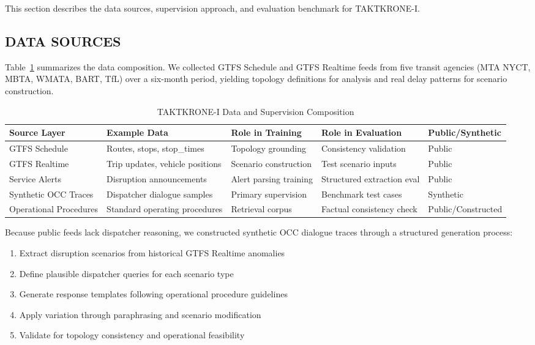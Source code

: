 \documentclass{IEEEoj}
\begin{document}
This section describes the data sources, supervision approach, and evaluation benchmark for TAKTKRONE-I.

\subsection{DATA SOURCES}

Table~\ref{tab:data_composition} summarizes the data composition. We collected GTFS Schedule and GTFS Realtime feeds from five transit agencies (MTA NYCT, MBTA, WMATA, BART, TfL) over a six-month period, yielding topology definitions for analysis and real delay patterns for scenario construction.

\begin{table}[t]
\centering
\caption{TAKTKRONE-I Data and Supervision Composition}
\label{tab:data_composition}
\begin{tabular}{@{}lllll@{}}
\toprule
\textbf{Source Layer} & \textbf{Example Data} & \textbf{Role in Training} & \textbf{Role in Evaluation} & \textbf{Public/Synthetic} \\
\midrule
GTFS Schedule & Routes, stops, stop\_times & Topology grounding & Consistency validation & Public \\
GTFS Realtime & Trip updates, vehicle positions & Scenario construction & Test scenario inputs & Public \\
Service Alerts & Disruption announcements & Alert parsing training & Structured extraction eval & Public \\
Synthetic OCC Traces & Dispatcher dialogue samples & Primary supervision & Benchmark test cases & Synthetic \\
Operational Procedures & Standard operating procedures & Retrieval corpus & Factual consistency check & Public/Constructed \\
\bottomrule
\end{tabular}
\end{table}

Because public feeds lack dispatcher reasoning, we constructed synthetic OCC dialogue traces through a structured generation process:
\begin{enumerate}
    \item Extract disruption scenarios from historical GTFS Realtime anomalies
    \item Define plausible dispatcher queries for each scenario type
    \item Generate response templates following operational procedure guidelines
    \item Apply variation through paraphrasing and scenario modification
    \item Validate for topology consistency and operational feasibility
\end{enumerate}
\end{document}

